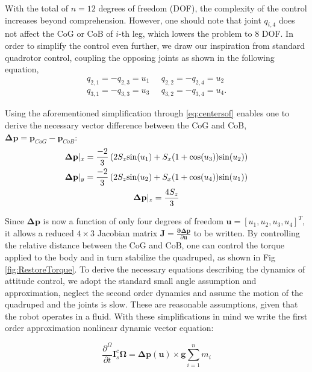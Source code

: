 With the total of $n=12$ degrees of freedom (DOF), the complexity of the control increases beyond comprehension. However, one should note that joint $q_{i,4}$ does not affect the CoG or CoB of $i$-th leg, which lowers the problem to 8 DOF. In order to simplify the control even further, we draw our inspiration from standard quadrotor control, coupling the opposing joints as shown in the following equation,
\begin{gather}
q_{2,1}=-q_{2,3} = u_1 \;\;\;\;\;
q_{2,2}=-q_{2,4} = u_2  \\ \nonumber
q_{3,1}=-q_{3,3} = u_3 \;\;\;\;\;
q_{3,2}=-q_{3,4} = u_4. 
\end{gather}

Using the aforementioned simplification through \eqref{eq:centersof} enables one to derive the necessary vector difference between the CoG and CoB, $\boldsymbol{\Delta}\textbf{p} = \textbf{p}_{CoG}-\textbf{p}_{CoB}$:
\begin{gather}
\boldsymbol{\Delta}\textbf{p}|_x = \frac{-2}{3}\left( 2 S_z \textup{sin}(u_1)+S_x (1+\textup{cos}(u_3))\textup{sin}(u_2) \right )\\ \nonumber
\boldsymbol{\Delta}\textbf{p}|_y = \frac{-2}{3}\left( 2 S_z \textup{sin}(u_2)+S_x (1+\textup{cos}(u_4))\textup{sin}(u_1) \right )\\ \nonumber
\boldsymbol{\Delta}\textbf{p}|_z = \frac{4 S_z}{3} 
\end{gather}

Since $\boldsymbol{\Delta}\textbf{p}$ is now a function of only four degrees of freedom $\textbf{u}=[u_1,u_2,u_3, u_4]^T$, it allows a reduced $4 \times 3$ Jacobian matrix $\textbf{J}=\frac{\boldsymbol{\partial \Delta}\textbf{p}}{\partial \textbf{u}}$ to be written. By controlling the relative distance between the CoG and CoB, one can control the torque applied to the body and in turn stabilize the quadruped, as shown in Fig \ref{fig:RestoreTorque}. To derive the necessary equations describing the dynamics of attitude control, we adopt the standard small angle assumption and approximation, neglect the second order dynamics and assume the motion of the quadruped and the joints is slow. These are reasonable assumptions, given that the robot operates in a fluid. With these simplifications in mind we write the first order approximation nonlinear dynamic vector equation:

\begin{equation}\label{eq:finalDyn}
\frac{\partial^\Omega}{\partial t}\textbf{I}_s^c\boldsymbol{\Omega}  = {\boldsymbol{\Delta}\textbf{p}}(\textbf{u}) \times \textbf{g}{\sum_{i=1}^n m_i } 
\end{equation}

